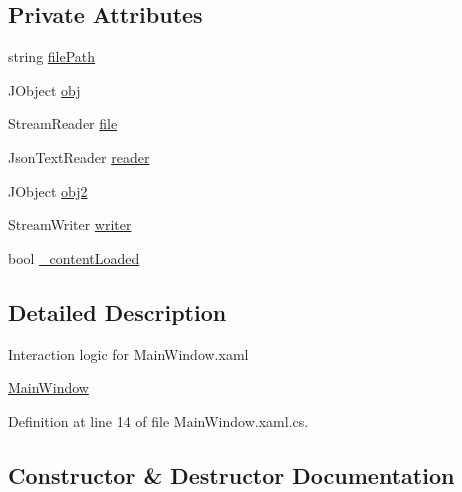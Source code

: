 \subsection*{Private Attributes}
\begin{DoxyCompactItemize}
\item 
string \hyperlink{class_c_p_u___o_s___simulator_1_1_save___file___editor_1_1_main_window_adf51ae9c43bb2cea5d6f9cc79d046ba2}{file\+Path}
\item 
J\+Object \hyperlink{class_c_p_u___o_s___simulator_1_1_save___file___editor_1_1_main_window_ac5dbce1cf34490c083f76ec1018b99e9}{obj}
\item 
Stream\+Reader \hyperlink{class_c_p_u___o_s___simulator_1_1_save___file___editor_1_1_main_window_a991061ea935a2bd7571b32b5b2cce64d}{file}
\item 
Json\+Text\+Reader \hyperlink{class_c_p_u___o_s___simulator_1_1_save___file___editor_1_1_main_window_a1656475bf9628e4335781cf30a84d93e}{reader}
\item 
J\+Object \hyperlink{class_c_p_u___o_s___simulator_1_1_save___file___editor_1_1_main_window_a5b79659efbe6c5a5177e7356e870a149}{obj2}
\item 
Stream\+Writer \hyperlink{class_c_p_u___o_s___simulator_1_1_save___file___editor_1_1_main_window_afe228202821ede30538aebda6142f8da}{writer}
\item 
bool \hyperlink{class_c_p_u___o_s___simulator_1_1_save___file___editor_1_1_main_window_a2555c588a1bab654bef42e3a161f6cf6}{\+\_\+content\+Loaded}
\end{DoxyCompactItemize}


\subsection{Detailed Description}
Interaction logic for Main\+Window.\+xaml 

\hyperlink{class_c_p_u___o_s___simulator_1_1_save___file___editor_1_1_main_window}{Main\+Window} 

Definition at line 14 of file Main\+Window.\+xaml.\+cs.



\subsection{Constructor \& Destructor Documentation}
\hypertarget{class_c_p_u___o_s___simulator_1_1_save___file___editor_1_1_main_window_a1049033cf55e7d851b9bd7ca5509cb78}{}
